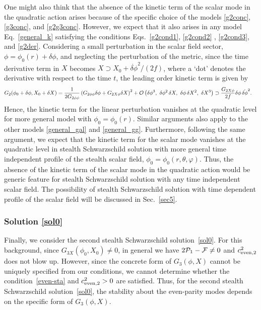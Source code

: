 \documentclass[prd,amsmath,amssymb,floatfix,superscriptaddress,notitlepage,nofootinbib,preprintnumbers]{revtex4-1}
\begin{document}
One might also think that the absence of the kinetic term of the scalar mode in the quadratic action
arises because of the specific choice of  
the models \eqref{g2conc}, \eqref{g3conc}, and \eqref{g2g3conc}. 
However, we expect that it
also arises in any model Eq.~\eqref{general_k}
satisfying the conditions Eqs.~\eqref{g2cond1}, \eqref{g2cond2} , \eqref{g2cond3}, and \eqref{g2der}.
Considering a small perturbation in the scalar field sector,
$\phi=\phi_0(r)+\delta \phi$, 
and neglecting the perturbation of the metric,
since the time derivative term in $X$
becomes $X\supset  X_0+\dot{\delta \phi}^2/(2f)$,
where a `dot' denotes the derivative with respect to the time $t$,
the leading order kinetic term is given by 
\begin{align}
G_2(\phi_0+\delta \phi, X_0+\delta X)
&=
\frac{1}{2G_{2\phi\phi}}
\left(
 G_{2\phi\phi}\delta\phi
+ G_{2X\phi}\delta X
\right)^2
+{\cal O}
\left(\delta\phi^3,~\delta \phi^2\, \delta X,~\delta \phi\, \delta X^2,~\delta X^3\right)
\supset
\frac{G_{2X\phi}}{2f}
\delta\phi \, \dot{\delta\phi}^2.
\end{align}
Hence,
the kinetic term for the linear perturbation vanishes at the quadratic level
for more general model with $\phi_0=\phi_0(r)$.
Similar arguments also apply to
the other models \eqref{general_gal} and \eqref{general_gg}.
Furthermore,
following the same argument,
we expect that  
the kinetic term for the scalar mode vanishes at the quadratic level
in stealth Schwarzschild solution 
with more general time independent profile of the stealth scalar field, 
$\phi_0=\phi_0(r,\theta,\varphi)$.
Thus, the absence of the kinetic term of the scalar mode in the quadratic action
would be generic feature for stealth Schwarzschild solution with any time independent scalar field.
The possibility of stealth Schwarzschild solution 
with time dependent profile of the scalar field
will be discussed in Sec.~\ref{sec5}.



\subsubsection{Solution \eqref{sol0}}
\label{sec443}


Finally, we consider the second stealth Schwarzschild solution~\eqref{sol0}.
For this background, since $G_{3X}(\phi_0,X_0)\neq 0$, 
in general we have $2{\cal P}_1-{\cal F}\neq 0$ and $c^2_{{\rm even},2}$ does not blow up.
However, since the concrete form of $G_3(\phi,X)$ cannot be uniquely specified 
from our conditions,
we cannot determine whether the condition~\eqref{even-sta} and $c^2_{{\rm even},2}>0$ are satisfied.
Thus, for the second stealth Schwarzschild solution~\eqref{sol0},
the stability about the even-parity modes 
depends on the specific form of $G_3(\phi,X)$.
\end{document}
